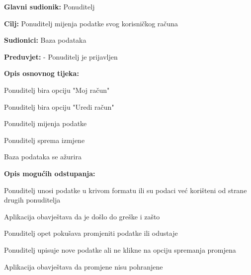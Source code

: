                     \noindent {}
					\begin{packed_item}
	
						\item \textbf{Glavni sudionik: } Ponuditelj
						\item  \textbf{Cilj:} Ponuditelj mijenja podatke svog korisničkog računa
						\item  \textbf{Sudionici:} Baza podataka
						\item  \textbf{Preduvjet:} - Ponuditelj je prijavljen
						\item  \textbf{Opis osnovnog tijeka:}
						
						\item[] \begin{packed_enum}
	
							\item Ponuditelj bira opciju "Moj račun"
							\item Ponuditelj bira opciju "Uredi račun"
                            \item Ponuditelj mijenja podatke
                            \item Ponuditelj sprema izmjene
                            \item Baza podataka se ažurira
						\end{packed_enum}
						
						\item  \textbf{Opis mogućih odstupanja:}
						
						\item[] \begin{packed_item}
	
							\item[2.a] Ponuditelj unosi podatke u krivom formatu ili su podaci već korišteni od strane drugih ponuditelja
							\item[] \begin{packed_enum}
								
								\item Aplikacija obavještava da je došlo do greške i zašto
								\item Ponuditelj opet pokušava promjeniti podatke ili odustaje
							\end{packed_enum}

                            \item[2.b] Ponuditelj upisuje nove podatke ali ne klikne na opciju spremanja promjena
                            \item[] \begin{packed_enum}
                                \item Aplikacija obavještava da promjene nisu pohranjene
                            \end{packed_enum}
						\end{packed_item}
					\end{packed_item}

